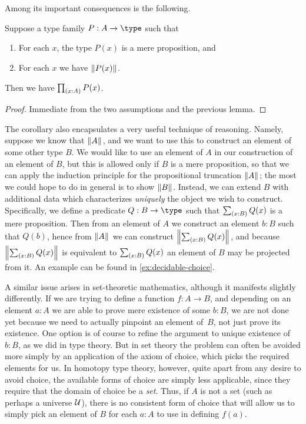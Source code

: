 Among its important consequences is the following.

\begin{cor}\label{cor:UC}
  Suppose a type family $P:A\to \type$ such that
  \begin{enumerate}
  \item For each $x$, the type $P(x)$ is a mere proposition, and
  \item For each $x$ we have $\mathopen{}\left\Vert P(x)\right\Vert_{}\mathclose{}$.
  \end{enumerate}
  Then we have $\prd{x:A} P(x)$.
\end{cor}
\begin{proof}
  Immediate from the two assumptions and the previous lemma.
\end{proof}

The corollary also encapsulates a very useful technique of reasoning.
Namely, suppose we know that $\mathopen{}\left\Vert A\right\Vert_{}\mathclose{}$, and we want to use this to construct an element of some other type $B$.
We would like to use an element of $A$ in our construction of an element of $B$, but this is allowed only if $B$ is a mere proposition, so that we can apply the induction principle for the propositional truncation $\mathopen{}\left\Vert A\right\Vert_{}\mathclose{}$; the most we could hope to do in general is to show $\mathopen{}\left\Vert B\right\Vert_{}\mathclose{}$.
%
Instead, we can extend $B$ with additional data which characterizes \emph{uniquely} the object we wish to construct.
Specifically, we define a predicate $Q:B\to\type$ such that $\sm{x:B} Q(x)$ is a mere proposition.
Then from an element of $A$ we construct an element $b:B$ such that $Q(b)$, hence from $\mathopen{}\left\Vert A\right\Vert_{}\mathclose{}$ we can construct $\brck{\sm{x:B} Q(x)}$, and because $\brck{\sm{x:B} Q(x)}$ is equivalent to $\sm{x:B} Q(x)$ an element of $B$ may be projected from it.
An example can be found in \cref{ex:decidable-choice}.

A similar issue arises in set-theoretic mathematics, although it manifests slightly
differently. If we are trying to define a function $f: A \to B$, and depending on an
element $a : A$ we are able to prove mere existence of some $b : B$, we are not done yet
because we need to actually pinpoint an element of~$B$, not just prove its existence.
One option is of course to refine the argument to unique existence of $b : B$, as we did in type theory. But in set theory the problem can often be avoided more simply by an application of the axiom of choice, which picks the required elements for us.
In homotopy type theory, however, quite apart from any desire to avoid choice, the available forms of choice are simply less applicable, since they require that the domain of choice be a \emph{set}.
Thus, if $A$ is not a set (such as perhaps a universe $\mathcal{U}$), there is no consistent form of choice that will allow us to simply pick an element of $B$ for each $a : A$ to use in defining $f(a)$.

